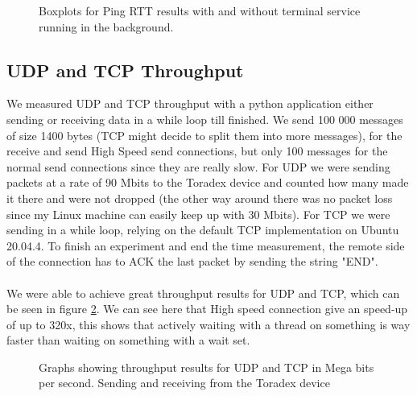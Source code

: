 \begin{figure}[ht]
    \centering
    \scalebox{0.7}{ }
    \caption{Boxplots for Ping RTT results with and without terminal service running in the background.}
    \label{fig:net_ping}
\end{figure}


\subsection{UDP and TCP Throughput}

We measured UDP and TCP throughput with a python application either sending or receiving data in a while loop till finished. We send 100 000 messages of size 1400 bytes (TCP might decide to split them into more messages), for the receive and send High Speed send connections, but only 100 messages for the normal send connections since they are really slow. For UDP we were sending packets at a rate of 90 Mbits to the Toradex device and counted how many made it there and were not dropped (the other way around there was no packet loss since my Linux machine can easily keep up with 30 Mbits). For TCP we were sending in a while loop, relying on the default TCP implementation on Ubuntu 20.04.4. To finish an experiment and end the time measurement, the remote side of the connection has to ACK the last packet by sending the string "END".
\\
\\
We were able to achieve great throughput results for UDP and TCP, which can be seen in figure \ref{fig:net_th}. We can see here that High speed connection give an speed-up of up to 320x, this shows that actively waiting with a thread on something is way faster than waiting on something with a wait set.

\begin{figure}[ht]
    \centering
         \subfloat[\centering ]{{\scalebox{0.4}{ }}}
         \subfloat[\centering ]{{\scalebox{0.4}{ }}}

    \caption{Graphs showing throughput results for UDP and TCP in Mega bits per second. Sending and receiving from the Toradex device}
    \label{fig:net_th}
\end{figure}

